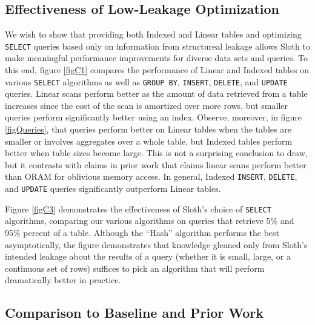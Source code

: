 \documentclass[USenglish,oneside,twocolumn]{article}
\def\name/{Sloth}
\begin{document}

\subsection{Effectiveness of Low-Leakage Optimization}
We wish to show that providing both Indexed and Linear tables and optimizing \texttt{SELECT} queries based only on information from structureal leakage allows \name/ to make meaningful performance improvements for diverse data sets and queries. To this end, figure \ref{figC1} compares the performance of Linear and Indexed tables on various \texttt{SELECT} algorithms as well as \texttt{GROUP BY}, \texttt{INSERT}, \texttt{DELETE}, and \texttt{UPDATE} queries. Linear scans perform better as the amount of data retrieved from a table increases since the cost of the scan is amortized over more rows, but smaller queries perform significantly better using an index. Observe, moreover, in figure \ref{figQueries}, that queries perform better on Linear tables when the tables are smaller or involves aggregates over a whole table, but Indexed tables perform better when table sizes become large. This is not a surprising conclusion to draw, but it contrasts with claims in prior work \cite{RLT15} that claims linear scans perform better than ORAM for oblivious memory access. In general, Indexed \texttt{INSERT}, \texttt{DELETE}, and \texttt{UPDATE} queries significantly outperform Linear tables.

Figure \ref{figC3} demonstrates the effectiveness of \name/'s choice of \texttt{SELECT} algorithms, comparing our various algorithms on queries that retrieve 5\% and 95\% percent of a table. Although the ``Hash'' algorithm performs the best asymptotically, the figure demonstrates that knowledge gleaned only from \name/'s intended leakage about the results of a query (whether it is small, large, or a continuous set of rows) suffices to pick an algorithm that will perform dramatically better in practice. 

\subsection{Comparison to Baseline and Prior Work}
\end{document}
